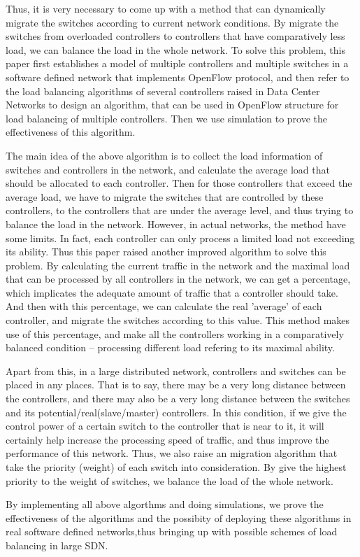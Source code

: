 \begin{englishabstract}
Thus, it is very necessary to come up with a method that can dynamically migrate the switches according to current network conditions. By migrate the switches from overloaded controllers to controllers that have comparatively less load, we can balance the load in the whole network. To solve this problem, this paper first establishes a model of multiple controllers and multiple switches in a software defined network that implements OpenFlow protocol, and then refer to the load balancing algorithms of several controllers raised in Data Center Networks to design an algorithm, that can be used in OpenFlow structure for load balancing of multiple controllers. Then we use simulation to prove the effectiveness of this algorithm.

The main idea of the above algorithm is to collect the load information of switches and controllers in the network, and calculate the average load that should be allocated to each controller. Then for those controllers that exceed the average load, we have to migrate the switches that are controlled by these controllers, to the controllers that are under the average level, and thus trying to balance the load in the network. However, in actual networks, the method have some limits. In fact, each controller can only process a limited load not exceeding its ability. Thus this paper raised another improved algorithm to solve this problem. By calculating the current traffic in the network and the maximal load that can be processed by all controllers in the network, we can get a percentage, which implicates the adequate amount of traffic that a controller should take. And then with this percentage, we can calculate the real 'average' of each controller, and migrate the switches according to this value. This method makes use of this percentage, and make all the controllers working in a comparatively balanced condition -- processing different load refering to its maximal ability.

Apart from this, in a large distributed network, controllers and switches can be placed in any places. That is to say, there may be a very long distance between the controllers, and there may also be a very long distance between the switches and its potential/real(slave/master) controllers. In this condition, if we give the control power of a certain switch to the controller that is near to it, it will certainly help increase the processing speed of traffic, and thus improve the performance of this network. Thus, we also raise an migration algorithm that take the priority (weight) of each switch into consideration. By give the highest priority to the weight of switches, we balance the load of the whole network. 

By implementing all above algorthms and doing simulations, we prove the effectiveness of the algorithms and the possibity of deploying these algorithms in real software defined networks,thus bringing up with possible schemes of load balancing in large SDN.

  
\end{englishabstract}
